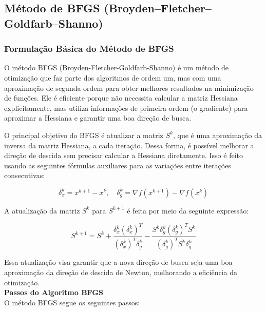 \documentclass[a4paper, 12pt]{article}
\begin{document}
\newpage
\subsection{Método de BFGS (Broyden–Fletcher–Goldfarb–Shanno)}

\subsubsection{Formulação Básica do Método de BFGS}
O método BFGS (Broyden-Fletcher-Goldfarb-Shanno) é um método de otimização que faz parte dos algoritmos de ordem um, mas com uma aproximação de segunda ordem para obter melhores resultados na minimização de funções. Ele é eficiente porque não necessita calcular a matriz Hessiana explicitamente, mas utiliza informações de primeira ordem (o gradiente) para aproximar a Hessiana e garantir uma boa direção de busca.

O principal objetivo do BFGS é atualizar a matriz $S^k$, que é uma aproximação da inversa da matriz Hessiana, a cada iteração. Dessa forma, é possível melhorar a direção de descida sem precisar calcular a Hessiana diretamente. Isso é feito usando as seguintes fórmulas auxiliares para as variações entre iterações consecutivas:

\begin{equation}
\delta_x^k = x^{k+1} - x^k, \quad \delta_g^k = \nabla f(x^{k+1}) - \nabla f(x^k)
\end{equation}

A atualização da matriz $S^k$ para $S^{k+1}$ é feita por meio da seguinte expressão:

\begin{equation}
S^{k+1} = S^k + \frac{\delta_x^k (\delta_x^k)^T}{(\delta_x^k)^T \delta_g^k} - \frac{S^k \delta_g^k (\delta_g^k)^T S^k}{(\delta_g^k)^T S^k \delta_g^k}
\end{equation}

Essa atualização visa garantir que a nova direção de busca seja uma boa aproximação da direção de descida de Newton, melhorando a eficiência da otimização.\\

\textbf{Passos do Algoritmo BFGS}\\

O método BFGS segue os seguintes passos:
\end{document}
